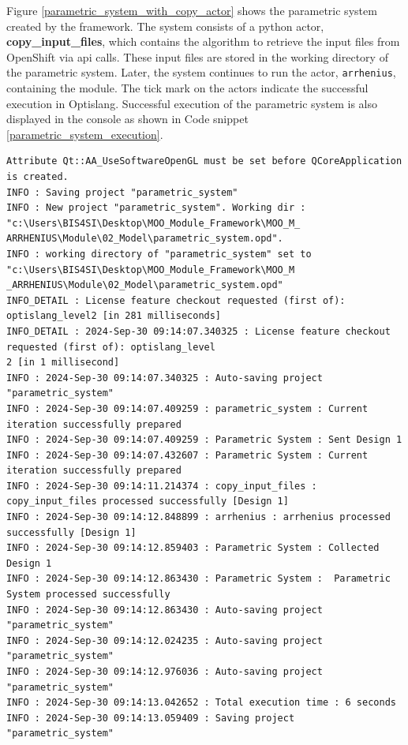 Figure \ref{parametric_system_with_copy_actor} shows the parametric system created by the framework. The system consists of a python actor, \textbf{copy\_input\_files},
which contains the algorithm to retrieve the input files from OpenShift via \acrshort{api} calls. These input files are stored in the working directory of the 
parametric system. Later, the system continues to run the actor, \texttt{arrhenius}, containing the module. The tick mark on the actors indicate the successful 
execution in Optislang. Successful execution of the parametric system is also displayed in the console as shown in Code snippet \ref{parametric_system_execution}.
\renewcommand{\lstlistingname}{Code}
\begin{lstlisting}[style=terminal, caption=Message providing status of parametric system execution, label={parametric_system_execution}]
Attribute Qt::AA_UseSoftwareOpenGL must be set before QCoreApplication is created.
INFO : Saving project "parametric_system"
INFO : New project "parametric_system". Working dir : "c:\Users\BIS4SI\Desktop\MOO_Module_Framework\MOO_M_
ARRHENIUS\Module\02_Model\parametric_system.opd".
INFO : working directory of "parametric_system" set to "c:\Users\BIS4SI\Desktop\MOO_Module_Framework\MOO_M
_ARRHENIUS\Module\02_Model\parametric_system.opd"
INFO_DETAIL : License feature checkout requested (first of): optislang_level2 [in 281 milliseconds]
INFO_DETAIL : 2024-Sep-30 09:14:07.340325 : License feature checkout requested (first of): optislang_level
2 [in 1 millisecond]
INFO : 2024-Sep-30 09:14:07.340325 : Auto-saving project "parametric_system"
INFO : 2024-Sep-30 09:14:07.409259 : parametric_system : Current iteration successfully prepared
INFO : 2024-Sep-30 09:14:07.409259 : Parametric System : Sent Design 1
INFO : 2024-Sep-30 09:14:07.432607 : Parametric System : Current iteration successfully prepared
INFO : 2024-Sep-30 09:14:11.214374 : copy_input_files : copy_input_files processed successfully [Design 1]
INFO : 2024-Sep-30 09:14:12.848899 : arrhenius : arrhenius processed successfully [Design 1]
INFO : 2024-Sep-30 09:14:12.859403 : Parametric System : Collected Design 1
INFO : 2024-Sep-30 09:14:12.863430 : Parametric System :  Parametric System processed successfully
INFO : 2024-Sep-30 09:14:12.863430 : Auto-saving project "parametric_system"
INFO : 2024-Sep-30 09:14:12.024235 : Auto-saving project "parametric_system"
INFO : 2024-Sep-30 09:14:12.976036 : Auto-saving project "parametric_system"
INFO : 2024-Sep-30 09:14:13.042652 : Total execution time : 6 seconds
INFO : 2024-Sep-30 09:14:13.059409 : Saving project "parametric_system"
\end{lstlisting}

